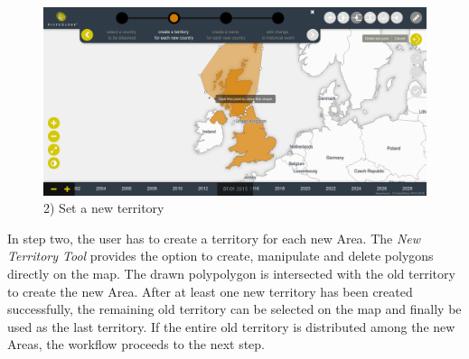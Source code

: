 \begin{minipage}[t]{0.47\textwidth}

  \begin{figure}[H]
    \centering
    \includegraphics[width=1.0\textwidth]{graphics/development/user_interface_design_process/4_set_new_territories.png}
    \caption{2) Set a new territory}
    \label{fig:final_4_set_new_territories}
  \end{figure}

  In step two, the user has to create a territory for each new Area. The \emph{New Territory Tool} provides the option to create, manipulate and delete polygons directly on the map. The drawn polypolygon is intersected with the old territory to create the new Area. After at least one new territory has been created successfully, the remaining old territory can be selected on the map and finally be used as the last territory. If the entire old territory is distributed among the new Areas, the workflow proceeds to the next step.

\end{minipage}

